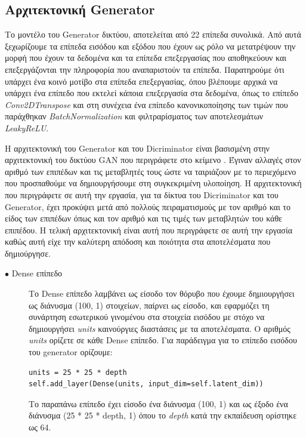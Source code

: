 \subsection{Αρχιτεκτονική Generator}
Το μοντέλο του Generator δικτύου, αποτελείται από 22 επίπεδα συνολικά. Από αυτά ξεχωρίζουμε τα επίπεδα εισόδου και εξόδου που έχουν ως ρόλο να μετατρέψουν την μορφή που έχουν τα δεδομένα και τα επίπεδα επεξεργασίας που αποθηκεύουν και επεξεργάζονται την πληροφορία που αναπαριστούν τα επίπεδα. Παρατηρούμε ότι υπάρχει ένα κοινό μοτίβο στα επίπεδα επεξεργασίας, όπου βλέπουμε αρχικά να υπάρχει ένα επίπεδο που εκτελεί κάποια επεξεργασία στα δεδομένα, όπως το επίπεδο \textit{Conv2DTranspose} και στη συνέχεια ένα επίπεδο κανονικοποίησης των τιμών που παράχθηκαν \textit{BatchNormalization} και φιλτραρίσματος των αποτελεσμάτων \textit{LeakyReLU}.
\par
Η αρχιτεκτονική του Generator και του Dicriminator είναι βασισμένη στην αρχιτεκτονική του δικτύου GAN που περιγράφετε στο κείμενο \cite{mnist}. Έγιναν αλλαγές στον αριθμό των επιπέδων και τις μεταβλητές τους ώστε να ταιριάζουν με το περιεχόμενο που προσπαθούμε να δημιουργήσουμε στη συγκεκριμένη υλοποίηση. Η αρχιτεκτονική που περιγράφετε σε αυτή την εργασία, για τα δίκτυα του Dicriminator και του Generator, έχει προκύψει μετά από πολλούς πειραματισμούς με τον αριθμό και το είδος των επιπέδων όπως και τον αριθμό και τις τιμές των μεταβλητών του κάθε επιπέδου. Η τελική αρχιτεκτονική είναι αυτή που περιγράφετε σε αυτή την εργασία καθώς αυτή είχε την καλύτερη απόδοση και ποιότητα στα αποτελέσματα που δημιούργησε.

\begin{description}
\item[$\bullet$ Dense επίπεδο] Το Dense επίπεδο λαμβάνει ως είσοδο τον θόρυβο που έχουμε δημιουργήσει ως διάνυσμα (100, 1) στοιχείων, παίρνει ως είσοδο, και εφαρμόζει τη συνάρτηση εσωτερικού γινομένου στα στοιχεία εισόδου με στόχο να δημιουργήσει \textit{units} καινούργιες διαστάσεις με τα αποτελέσματα. Ο αριθμός \textit{units} ορίζετε σε κάθε Dense επίπεδο. Για παράδειγμα για το επίπεδο εισόδου του generator ορίζουμε:
\begin{verbatim}
units = 25 * 25 * depth
self.add_layer(Dense(units, input_dim=self.latent_dim))
\end{verbatim}
\par
Το παραπάνω επίπεδο έχει είσοδο ένα διάνυσμα (100, 1) και ως έξοδο ένα διάνυσμα (25 * 25 * depth, 1) όπου το \textit{depth} κατά την εκπαίδευση ορίστηκε ως 64. \cite{dense}
\end{description}

